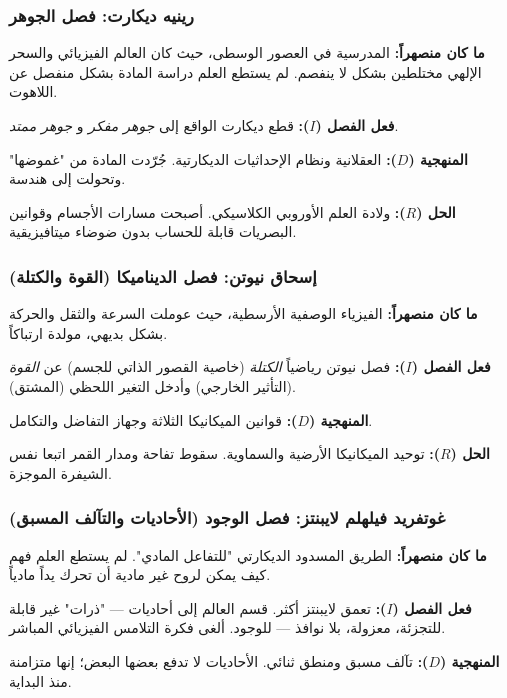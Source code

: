 \documentclass[12pt,a4paper]{article}
\begin{document}
	\subsubsection{رينيه ديكارت: فصل الجوهر}
	
	\textbf{ما كان منصهراً:} المدرسية في العصور الوسطى، حيث كان العالم الفيزيائي والسحر الإلهي مختلطين بشكل لا ينفصم. لم يستطع العلم دراسة المادة بشكل منفصل عن اللاهوت.
	
	\textbf{فعل الفصل (\(I\)):} قطع ديكارت الواقع إلى \emph{جوهر مفكر} و \emph{جوهر ممتد}.
	
	\textbf{المنهجية (\(D\)):} العقلانية ونظام الإحداثيات الديكارتية. جُرّدت المادة من "غموضها" وتحولت إلى هندسة.
	
	\textbf{الحل (\(R\)):} ولادة العلم الأوروبي الكلاسيكي. أصبحت مسارات الأجسام وقوانين البصريات قابلة للحساب بدون ضوضاء ميتافيزيقية.
	
	\subsubsection{إسحاق نيوتن: فصل الديناميكا (القوة والكتلة)}
	
	\textbf{ما كان منصهراً:} الفيزياء الوصفية الأرسطية، حيث عوملت السرعة والثقل والحركة بشكل بديهي، مولدة ارتباكاً.
	
	\textbf{فعل الفصل (\(I\)):} فصل نيوتن رياضياً \emph{الكتلة} (خاصية القصور الذاتي للجسم) عن \emph{القوة} (التأثير الخارجي) وأدخل التغير اللحظي (المشتق).
	
	\textbf{المنهجية (\(D\)):} قوانين الميكانيكا الثلاثة وجهاز التفاضل والتكامل.
	
	\textbf{الحل (\(R\)):} توحيد الميكانيكا الأرضية والسماوية. سقوط تفاحة ومدار القمر اتبعا نفس الشيفرة الموجزة.
	
	\subsubsection{غوتفريد فيلهلم لايبنتز: فصل الوجود (الأحاديات والتآلف المسبق)}
	
	\textbf{ما كان منصهراً:} الطريق المسدود الديكارتي "للتفاعل المادي". لم يستطع العلم فهم كيف يمكن لروح غير مادية أن تحرك يداً مادياً.
	
	\textbf{فعل الفصل (\(I\)):} تعمق لايبنتز أكثر. قسم العالم إلى أحاديات — "ذرات" غير قابلة للتجزئة، معزولة، بلا نوافذ — للوجود. ألغى فكرة التلامس الفيزيائي المباشر.
	
	\textbf{المنهجية (\(D\)):} تآلف مسبق ومنطق ثنائي. الأحاديات لا تدفع بعضها البعض؛ إنها متزامنة منذ البداية.
	
\end{document}
